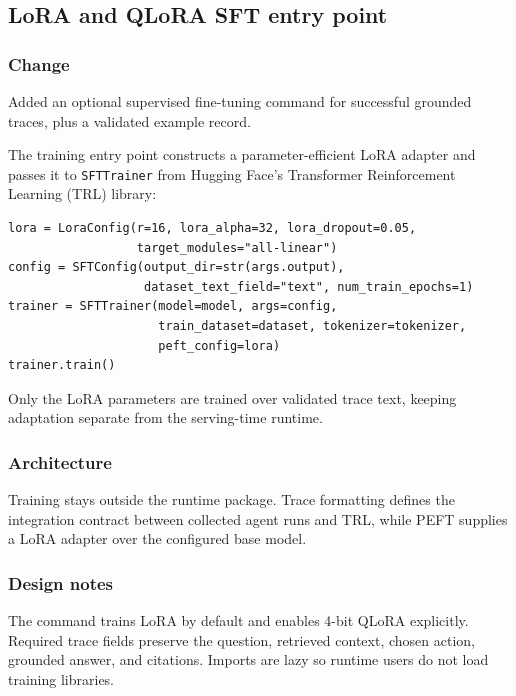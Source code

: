 
\subsection{LoRA and QLoRA SFT entry point}


\subsubsection{Change}

Added an optional supervised fine-tuning command for successful grounded traces, plus a validated example record.

The training entry point constructs a parameter-efficient LoRA adapter and passes it to \texttt{SFTTrainer} from Hugging Face's Transformer Reinforcement Learning (TRL) library:

\begin{verbatim}
lora = LoraConfig(r=16, lora_alpha=32, lora_dropout=0.05,
                  target_modules="all-linear")
config = SFTConfig(output_dir=str(args.output),
                   dataset_text_field="text", num_train_epochs=1)
trainer = SFTTrainer(model=model, args=config,
                     train_dataset=dataset, tokenizer=tokenizer,
                     peft_config=lora)
trainer.train()
\end{verbatim}

Only the LoRA parameters are trained over validated trace text, keeping adaptation separate from the serving-time runtime.

\subsubsection{Architecture}

Training stays outside the runtime package. Trace formatting defines the integration contract between collected agent runs and TRL, while PEFT supplies a LoRA adapter over the configured base model.

\subsubsection{Design notes}

The command trains LoRA by default and enables 4-bit QLoRA explicitly. Required trace fields preserve the question, retrieved context, chosen action, grounded answer, and citations. Imports are lazy so runtime users do not load training libraries.


